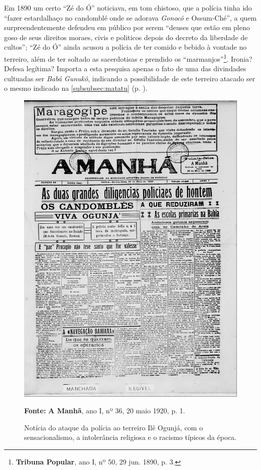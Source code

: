 Em 1890 um certo ``Zé do Ó'' noticiava, em tom chistoso, que a polícia tinha ido ``fazer estardalhaço no candomblé onde se adorava \textit{Gonocô} e Ossum-Ché'', a quem surpreendentemente defendeu em público por serem ``deuses que estão em pleno goso de seus direitos moraes, civis e politicos depois do decreto da liberdade de cultos''; ``Zé do Ó'' ainda acusou a polícia de ter comido e bebido à vontade no terreiro, além de ter soltado as sacerdotisas e prendido os ``marmanjos''\footnote{\textbf{Tribuna Popular}, ano I, nº 50, 29 jun. 1890, p. 3.}. Ironia? Defesa legítima? Importa a esta pesquisa apenas o fato de uma das divindades cultuadas ser \textit{Babá Gunukô}, indicando a possibilidade de este terreiro atacado ser o mesmo indicado na \autoref{subsubsec:matatu} (p. \pageref{subsubsec:matatu}).

\begin{figure}[!htp]
\centering
\caption{Notícia do ataque da polícia ao terreiro Ilê Ogunjá, com o sensacionalismo, a intolerância religiosa e o racismo típicos da época.}\includegraphics[width=1\textwidth]{4-cap3/complementos/imagens/19200520-vivaogunja.jpg}{\par \footnotesize \textbf{Fonte:} \textbf{A Manhã}, ano I, nº 36, 20 maio 1920, p. 1. }
\label{fig:vivaogunja}
\end{figure}

